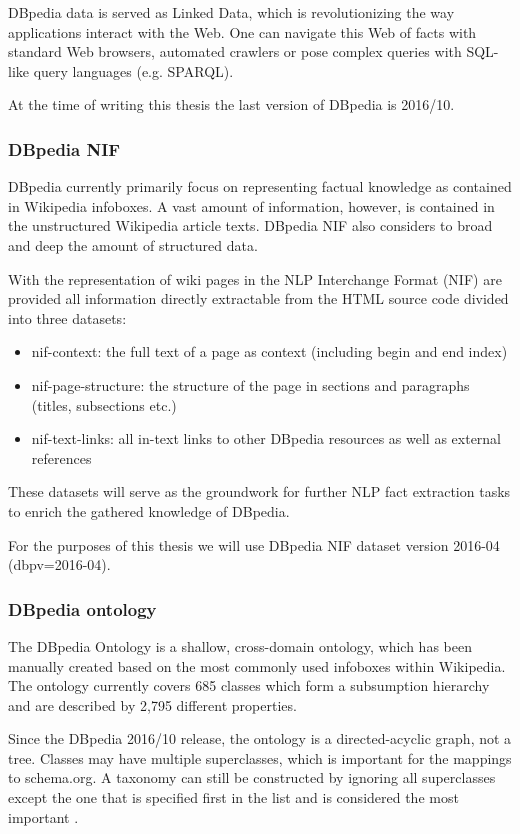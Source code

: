 \documentclass[thesis=M,english]{FITthesis}[2018/05/30]
\begin{document}
	DBpedia data is served as Linked Data, which is revolutionizing the way applications interact with the Web. One can navigate this Web of facts with standard Web browsers, automated crawlers or pose complex queries with SQL-like query languages (e.g. SPARQL).

	At the time of writing this thesis the last version of DBpedia is 2016/10.
	
\subsubsection{DBpedia NIF}\label{DBpediaNIF}
	DBpedia \cite{dbpedia:NIF} currently primarily focus on representing factual knowledge as contained in Wikipedia infoboxes. A vast amount of information, however, is contained in the unstructured Wikipedia article texts. DBpedia NIF also considers to broad and deep the amount of structured data.


	With the representation of wiki pages in the NLP Interchange Format (NIF) are provided all information directly extractable from the HTML source code divided into three datasets:
	\begin{itemize}
		\item nif-context: the full text of a page as context (including begin and end index)
		\item nif-page-structure: the structure of the page in sections and paragraphs (titles, subsections etc.)
		\item nif-text-links: all in-text links to other DBpedia resources as well as external references
	\end{itemize}
	These datasets will serve as the groundwork for further NLP fact extraction tasks to enrich the gathered knowledge of DBpedia.

For the purposes of this thesis we will use DBpedia NIF dataset version 2016-04 (dbpv=2016-04).

\subsubsection{DBpedia ontology}\label{DBpediaOntology}
	The DBpedia Ontology is a shallow, cross-domain ontology, which has been manually created based on the most commonly used infoboxes within Wikipedia. The ontology currently covers 685 classes which form a subsumption hierarchy and are described by 2,795 different properties.

	Since the DBpedia 2016/10 release, the ontology is a directed-acyclic graph, not a tree. Classes may have multiple superclasses, which is important for the mappings to schema.org. A taxonomy can still be constructed by ignoring all superclasses except the one that is specified first in the list and is considered the most important \cite{dbpedia:Ontology}. 
\end{document}
